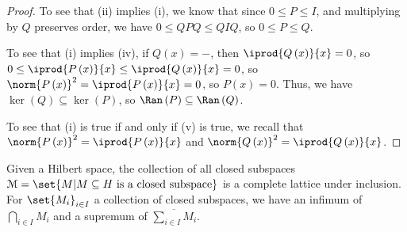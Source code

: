 \documentclass[10pt]{mypackage}
\begin{document}
\begin{proof}
  To see that (ii) implies (i), we know that since $0 \leq P \leq I$, and multiplying by $Q$ preserves order, we have $0 \leq QPQ \leq QIQ$, so $0 \leq P \leq Q$.\newline

  To see that (i) implies (iv), if $Q\left(x\right) = -$, then $ \iprod{Q\left(x\right)}{x} = 0 $, so $0 \leq \iprod{P\left(x\right)}{x} \leq \iprod{Q\left(x\right)}{x} = 0$, so $\norm{P\left(x\right)}^2 = \iprod{P\left(x\right)}{x} = 0$, so $P\left(x\right) = 0$. Thus, we have $\ker\left(Q\right)\subseteq \ker\left(P\right)$, so $\Ran\left(P\right)\subseteq \Ran\left(Q\right)$.\newline

  To see that (i) is true if and only if (v) is true, we recall that $\norm{P\left(x\right)}^2 = \iprod{P\left(x\right)}{x}$ and $\norm{Q\left(x\right)}^2 = \iprod{Q\left(x\right)}{x}$.
\end{proof}
Given a Hilbert space, the collection of all closed subspaces $\mathcal{M} = \set{M | M\subseteq H\text{ is a closed subspace}}$ is a complete lattice under inclusion. For $\set{M_i}_{i\in I}$ a collection of closed subspaces, we have an infimum of $\bigcap_{i\in I}M_i$ and a supremum of $\overline{\sum_{i\in I}M_i}$.\newline
\end{document}
